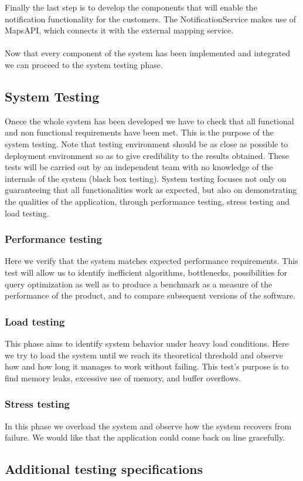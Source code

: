 Finally the last step is to develop the components that will enable the notification functionality for the customers. The NotificationService makes use of MapsAPI, which connects it with the external mapping service.\\\\
Now that every component of the system has been implemented and integrated we can proceed to the system testing phase.
\subsection{System Testing}
Onece the whole system has been developed we have to check that all functional and non functional requirements have been met. This is the purpose of the system testing. Note that testing environment should be as close as possible to deployment environment so as to give credibility to the results obtained. These tests will be carried out by an independent team with no knowledge of the internals of the system (black box testing).
System testing focuses not only on guaranteeing that all functionalities work as expected, but also on demonstrating the qualities of the application, through performance testing, stress testing and load testing.
\subsubsection{Performance testing}
Here we verify that the system matches expected performance requirements. This test will allow us to identify inefficient algorithms, bottlenecks, possibilities for query optimization as well as to produce a benchmark as a measure of the performance of the product, and to compare subsequent versions of the software.
\subsubsection{Load testing}
This phase aims to identify system behavior under heavy load conditions. Here we try to load the system until we reach its theoretical threshold and observe how and how long it manages to work without failing. This test's purpose is to find memory leaks, excessive use of memory, and buffer overflows.
\subsubsection{Stress testing}
In this phase we overload the system and observe how the system recovers from failure. We would like that the application could come back on line gracefully.
\subsection{Additional testing specifications}
